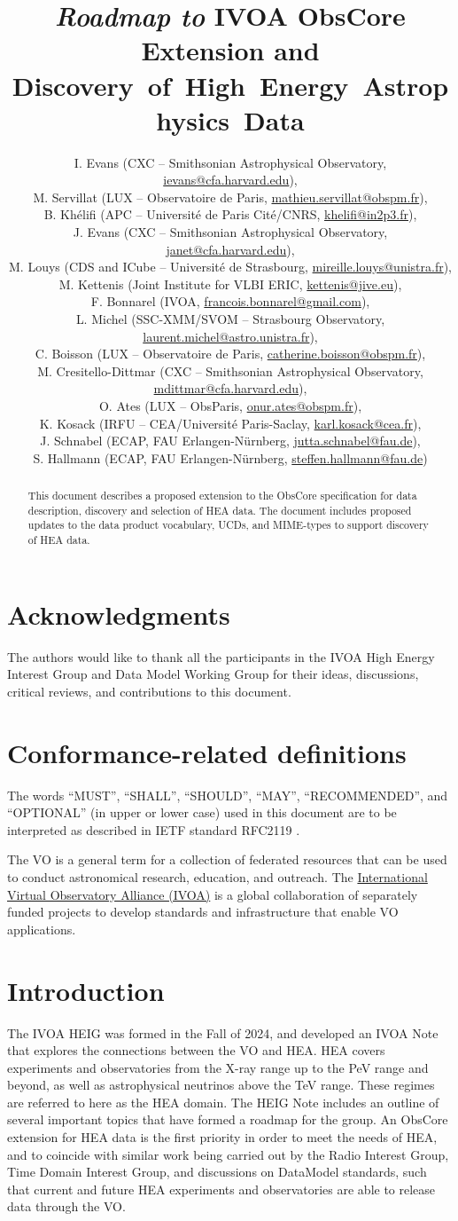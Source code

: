 \documentclass[11pt,a4paper]{ivoa}
\title{{\em Roadmap to\/} IVOA ObsCore Extension and \hbox{Discovery of High Energy Astrophysics Data}}
\author{
	I. Evans (CXC -- Smithsonian Astrophysical Observatory, \href{mailto:ievans@cfa.harvard.edu}{ievans@cfa.harvard.edu}),\\
	M. Servillat (LUX -- Observatoire de Paris, \href{mailto:mathieu.servillat@obspm.fr}{mathieu.servillat@obspm.fr}),\\
	B. Kh\'elifi (APC -- Universit\'e de Paris Cit\'e/CNRS, \href{mailto:khelifi@in2p3.fr}{khelifi@in2p3.fr}),\\
	J. Evans (CXC -- Smithsonian Astrophysical Observatory, \href{mailto:janet@cfa.harvard.edu}{janet@cfa.harvard.edu}),\\
	M. Louys (CDS and ICube -- Universit\'e de Strasbourg, \href{mailto:mireille.louys@unistra.fr}{mireille.louys@unistra.fr}),\\
	M. Kettenis (Joint Institute for VLBI ERIC, \href{mailto:kettenis@jive.eu}{kettenis@jive.eu}),\\
	F. Bonnarel (IVOA, \href{mailto:francois.bonnarel@gmail.com}{francois.bonnarel@gmail.com}),\\
	L. Michel (SSC-XMM/SVOM -- Strasbourg Observatory,\\ \href{mailto:laurent.michel@astro.unistra.fr}{\qquad laurent.michel@astro.unistra.fr}),\\
	C. Boisson (LUX -- Observatoire de Paris, \href{mailto:catherine.boisson@obspm.fr}{catherine.boisson@obspm.fr}),\\
	M. Cresitello-Dittmar (CXC -- Smithsonian Astrophysical \mbox{Observatory,} \href{mailto:mdittmar@cfa.harvard.edu}{\qquad mdittmar@cfa.harvard.edu}),\\
	O. Ates (LUX -- ObsParis, \href{mailto:onur.ates@obspm.fr}{onur.ates@obspm.fr}),\\
	K. Kosack (IRFU -- CEA/Université Paris-Saclay, \href{mailto:karl.kosack@cea.fr}{karl.kosack@cea.fr}),\\
	J. Schnabel (ECAP, FAU Erlangen-N{\"u}rnberg, \href{mailto:jutta.schnabel@fau.de}{jutta.schnabel@fau.de}),\\
	S. Hallmann (ECAP, FAU Erlangen-N{\"u}rnberg, \href{mailto:steffen.hallmann@fau.de}{steffen.hallmann@fau.de})
}
\begin{document}
\begin{abstract}
This document describes a proposed extension to the ObsCore specification for data description, discovery and selection of \gls{HEA} data. The document includes proposed updates to the data product vocabulary, UCDs, and MIME-types to support discovery of \gls{HEA} data.
\end{abstract}


\section*{Acknowledgments}

The authors would like to thank all the participants in the IVOA High Energy Interest Group and Data Model Working Group for their ideas, discussions, critical reviews, and contributions to this document.


\section*{Conformance-related definitions}

The words ``MUST'', ``SHALL'', ``SHOULD'', ``MAY'', ``RECOMMENDED'', and ``OPTIONAL'' (in upper or lower case) used in this document are to be interpreted as described in IETF standard RFC2119 \citep{std:RFC2119}.

The \gls{VO} is a general term for a collection of federated resources that can be used to conduct astronomical research, education, and outreach.
The \href{https://www.ivoa.net}{International Virtual Observatory Alliance (IVOA)} is a global collaboration of separately funded projects to develop standards and infrastructure that enable VO applications.

\glsresetall

\pagebreak
\section{Introduction}

The \gls{IVOA} \gls{HEIG} was formed in the Fall of 2024, and developed an \gls{IVOA} Note \citep{2024ivoa.note.heig} that explores the connections between the \gls{VO} and \gls{HEA}\null. \gls{HEA} covers experiments and observatories from the X-ray range up to the PeV range and beyond, as well as astrophysical neutrinos above the TeV range.  These regimes are referred to here as the \gls{HEA} domain. The \gls{HEIG} Note includes an outline of several important topics that have formed a roadmap for the group. An ObsCore \citep{2017ivoa.spec.0509L} extension for \gls{HEA} data is the first priority in order to meet the needs of \gls{HEA}, and to coincide with similar work being carried out by the Radio Interest Group, Time Domain Interest Group, and discussions on DataModel standards, such that current and future \gls{HEA} experiments and observatories are able to release data through the \gls{VO}.
\end{document}

